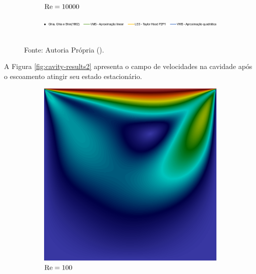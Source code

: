 \begin{figure}[h!]
\begin{subfigure}{0.4\textwidth}
        \caption{$\mathrm{Re}=10000$}
    \end{subfigure}
    \begin{subfigure}{\textwidth}
        \includegraphics[width=\linewidth]{Figuras/Cavity/Legenda.pdf}
    \end{subfigure}
    \\Fonte: Autoria Própria (\the\year).
    \label{fig:cavity-results}
\end{figure}

A Figura \ref{fig:cavity-results2} apresenta o campo de velocidades na cavidade após o escoamento atingir seu estado estacionário.

\begin{figure}[h!]
    \centering
    \caption{Campo de velocidades em regime estacionário na cavidade.}
    \begin{subfigure}{0.32\textwidth}
        \includegraphics[width=\linewidth]{Figuras/Cavity/Re100.png}
        \caption{$\mathrm{Re}=100$}
    \end{subfigure}
    \begin{subfigure}{0.32\textwidth}

\end{subfigure}
\end{figure}
